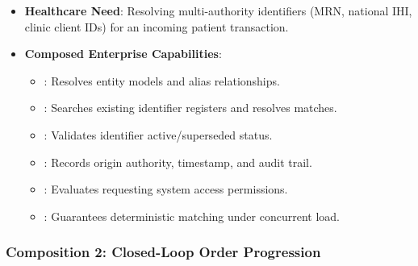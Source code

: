 \begin{itemize}

\item
\textbf{Healthcare Need}: Resolving multi-authority identifiers (MRN, national IHI, clinic client IDs) for an incoming patient transaction.



\item
\textbf{Composed Enterprise Capabilities}:


\begin{itemize}

\item
\texttt{}: Resolves entity models and alias relationships.



\item
\texttt{}: Searches existing identifier registers and resolves matches.



\item
\texttt{}: Validates identifier active/\allowbreak{}superseded status.



\item
\texttt{}: Records origin authority, timestamp, and audit trail.



\item
\texttt{}: Evaluates requesting system access permissions.



\item
\texttt{}: Guarantees deterministic matching under concurrent load.



\end{itemize}


\end{itemize}
\label{rad:enterprise:291}
\subsubsection*{Composition 2: Closed-Loop Order Progression}
\label{rad:enterprise:292}

